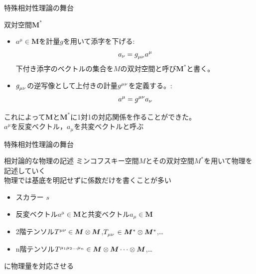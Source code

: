 \documentclass[unicode, aspectratio=169, 12pt]{beamer}
\begin{document}

\begin{frame}{特殊相対性理論の舞台}
    \begin{block}{双対空間$\bm{M}^*$}
        \begin{itemize}
        \item $a^\mu\in\bm{M}$を計量$g$を用いて添字を下げる:
            \begin{align*}
                a_\nu=\tensor{g}{_\mu_\nu} a^\mu
            \end{align*}
            下付き添字のベクトルの集合を$M$の双対空間と呼び$\bm{M}^*$と書く。
        \item $\tensor{g}{_\mu_\nu}$の逆写像として上付きの計量$\tensor{g}{^\mu^\nu}$を定義する。:
        \begin{align*}
            a^\mu=\tensor{g}{^\mu^\nu}a_\nu
        \end{align*}
        \end{itemize}
    \end{block}
これによって$\bm{M}$と$\bm{M}^*$に1対1の対応関係を作ることができた。\\
$a^\mu$を反変ベクトル，$a_\mu$を共変ベクトルと呼ぶ
\end{frame}


\begin{frame}{特殊相対性理論の舞台}
    \begin{block}{相対論的な物理の記述}
        ミンコフスキー空間$M$とその双対空間$M^*$を用いて物理を記述していく\\
        物理では基底を明記せずに係数だけを書くことが多い
        \begin{itemize}
            \item スカラー $s$
            \item 反変ベクトル$a^\mu\in\bm{M}$と共変ベクトル$a_\mu\in\bm{M}$
            \item 2階テンソル$\tensor{T}{^\mu^\nu}\in\bm{M}\otimes\bm{M}$,\quad$\tensor{T}{_\mu_\nu}\in\bm{M}^*\otimes\bm{M}^*$,\quad\dots
            \item n階テンソル$\tensor{T}{^{\mu_1}^{\mu_2}^{ \dots}^{\mu_n}}\in \bm{M}\otimes\bm{M}\dots \otimes\bm{M}$,\quad\dots
        \end{itemize}
    に物理量を対応させる
    \end{block}
\end{frame}
\end{document}
